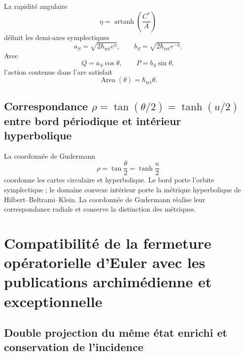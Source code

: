 La rapidité angulaire
\begin{equation}
 \eta=\operatorname{artanh}\!\left(\frac{C^*}{A}\right)
 \label{eq:l9s102:euler-rapidez}
\end{equation}
définit les demi-axes symplectiques
\begin{equation}
 a_S=\sqrt{2\hbar_{\mathrm{ret}}e^\eta},
 \qquad
 b_S=\sqrt{2\hbar_{\mathrm{ret}}e^{-\eta}}.
 \label{eq:l9s102:euler-semiejes}
\end{equation}
Avec
\begin{equation}
 Q=a_S\cos\theta,
 \qquad
 P=b_S\sin\theta,
 \label{eq:l9s102:euler-qp}
\end{equation}
l'action contenue dans l'arc satisfait
\begin{equation}
 \boxed{\operatorname{Area}(\theta)=\hbar_{\mathrm{ret}}\theta.}
 \label{eq:l9s102:euler-area-accion}
\end{equation}

\subsection{Correspondance \texorpdfstring{\(\rho=\tan(\theta/2)=\tanh(u/2)\)}{rho=tan(theta/2)=tanh(u/2)} entre bord périodique et intérieur hyperbolique}

La coordonnée de Gudermann
\begin{equation}
 \rho=\tan\frac\theta2=\tanh\frac u2
 \label{eq:l9s102:euler-gudermann}
\end{equation}
coordonne les cartes circulaire et hyperbolique.
Le bord porte l'orbite symplectique ; le domaine convexe intérieur porte
la métrique hyperbolique de Hilbert--Beltrami--Klein. La coordonnée de
Gudermann réalise leur correspondance radiale et conserve la distinction des
métriques.

\section{Compatibilité de la fermeture opératorielle d'Euler avec les publications archimédienne et exceptionnelle}
\label{sec:l9s102:euler-doble-proyeccion}

\subsection{Double projection du même état enrichi et conservation de l'incidence}

